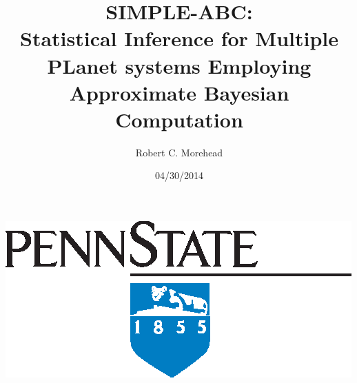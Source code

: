\documentclass{beamer}
\begin{document}
\title{SIMPLE-ABC: \\ Statistical Inference for Multiple PLanet systems Employing Approximate Bayesian Computation }  
\author{Robert C. Morehead}
\date{04/30/2014} 



\begin{frame}[plain]
\begin{center}
\includegraphics{mark2tonesolid.eps}
\end{center}
\titlepage
\end{frame}
\end{document}
